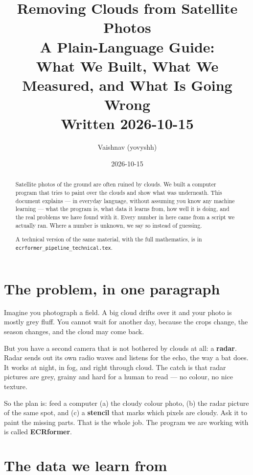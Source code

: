 \documentclass[11pt,a4paper]{article}
\title{\textbf{Removing Clouds from Satellite Photos}\\[0.3em]
\large A Plain-Language Guide:\\What We Built, What We Measured, and What Is Going Wrong\\[0.2em]
\normalsize Written 2026-10-15}
\author{Vaishnav (yovyshh)}
\date{2026-10-15}
\newcommand{\code}[1]{\texttt{#1}}
\newcommand{\term}[1]{\textbf{#1}}
\begin{document}
\maketitle

\begin{abstract}
\noindent
Satellite photos of the ground are often ruined by clouds. We built a computer program that tries
to paint over the clouds and show what was underneath. This document explains --- in everyday
language, without assuming you know any machine learning --- what the program is, what data it
learns from, how well it is doing, and the real problems we have found with it. Every number in
here came from a script we actually ran. Where a number is unknown, we say so instead of guessing.

A technical version of the same material, with the full mathematics, is in
\code{ecrformer\_pipeline\_technical.tex}.
\end{abstract}

\tableofcontents

\section{The problem, in one paragraph}

Imagine you photograph a field. A big cloud drifts over it and your photo is mostly grey fluff.
You cannot wait for another day, because the crops change, the season changes, and the cloud may
come back.

But you have a second camera that is not bothered by clouds at all: a \term{radar}. Radar sends out
its own radio waves and listens for the echo, the way a bat does. It works at night, in fog, and
right through cloud. The catch is that radar pictures are grey, grainy and hard for a human to read
--- no colour, no nice texture.

So the plan is: feed a computer (a) the cloudy colour photo, (b) the radar picture of the same
spot, and (c) a \term{stencil} that marks which pixels are cloudy. Ask it to paint the missing
parts. That is the whole job. The program we are working with is called \term{ECRformer}.

\section{The data we learn from}
\end{document}
